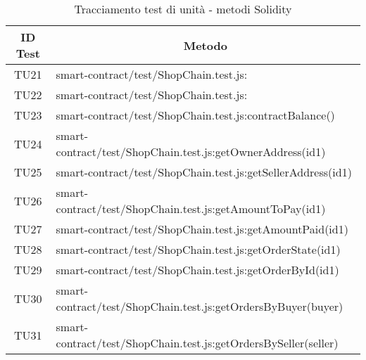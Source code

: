 \begin{table}[H]
  \centering
  \renewcommand{\arraystretch}{1.8}
  \begin{tabular}{c|p{15cm}}
    \rowcolor[HTML]{125E28}
    \color[HTML]{FFFFFF}\textbf{ID Test}
         & \multicolumn{1}{c}{\color[HTML]{FFFFFF}\textbf{Metodo}}         \\
    \hline
    TU21 & smart-contract/test/ShopChain.test.js:                          \\
    TU22 & smart-contract/test/ShopChain.test.js:                          \\
    TU23 & smart-contract/test/ShopChain.test.js:contractBalance()         \\
    TU24 & smart-contract/test/ShopChain.test.js:getOwnerAddress(id1)      \\
    TU25 & smart-contract/test/ShopChain.test.js:getSellerAddress(id1)     \\
    TU26 & smart-contract/test/ShopChain.test.js:getAmountToPay(id1)       \\
    TU27 & smart-contract/test/ShopChain.test.js:getAmountPaid(id1)        \\
    TU28 & smart-contract/test/ShopChain.test.js:getOrderState(id1)        \\
    TU29 & smart-contract/test/ShopChain.test.js:getOrderById(id1)         \\
    TU30 & smart-contract/test/ShopChain.test.js:getOrdersByBuyer(buyer)   \\
    TU31 & smart-contract/test/ShopChain.test.js:getOrdersBySeller(seller) \\
  \end{tabular}
  \caption{Tracciamento test di unità - metodi Solidity}
\end{table}